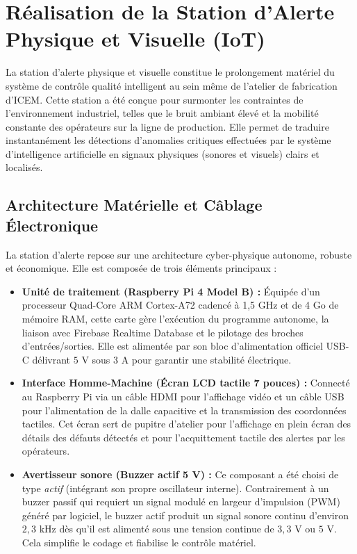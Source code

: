 \section{Réalisation de la Station d'Alerte Physique et Visuelle (IoT)}

La station d'alerte physique et visuelle constitue le prolongement matériel du système de contrôle qualité intelligent au sein même de l'atelier de fabrication d'ICEM. Cette station a été conçue pour surmonter les contraintes de l'environnement industriel, telles que le bruit ambiant élevé et la mobilité constante des opérateurs sur la ligne de production. Elle permet de traduire instantanément les détections d'anomalies critiques effectuées par le système d'intelligence artificielle en signaux physiques (sonores et visuels) clairs et localisés.

\subsection{Architecture Matérielle et Câblage Électronique}

La station d'alerte repose sur une architecture cyber-physique autonome, robuste et économique. Elle est composée de trois éléments principaux :
\begin{itemize}
    \item \textbf{Unité de traitement (Raspberry Pi 4 Model B) :} Équipée d'un processeur Quad-Core ARM Cortex-A72 cadencé à 1,5 GHz et de 4 Go de mémoire RAM, cette carte gère l'exécution du programme autonome, la liaison avec Firebase Realtime Database et le pilotage des broches d'entrées/sorties. Elle est alimentée par son bloc d'alimentation officiel USB-C délivrant $5\text{ V}$ sous $3\text{ A}$ pour garantir une stabilité électrique.
    \item \textbf{Interface Homme-Machine (Écran LCD tactile 7 pouces) :} Connecté au Raspberry Pi via un câble HDMI pour l'affichage vidéo et un câble USB pour l'alimentation de la dalle capacitive et la transmission des coordonnées tactiles. Cet écran sert de pupitre d'atelier pour l'affichage en plein écran des détails des défauts détectés et pour l'acquittement tactile des alertes par les opérateurs.
    \item \textbf{Avertisseur sonore (Buzzer actif 5 V) :} Ce composant a été choisi de type \textit{actif} (intégrant son propre oscillateur interne). Contrairement à un buzzer passif qui requiert un signal modulé en largeur d'impulsion (PWM) généré par logiciel, le buzzer actif produit un signal sonore continu d'environ $2{,}3\text{ kHz}$ dès qu'il est alimenté sous une tension continue de $3{,}3\text{ V}$ ou $5\text{ V}$. Cela simplifie le codage et fiabilise le contrôle matériel.
\end{itemize}

